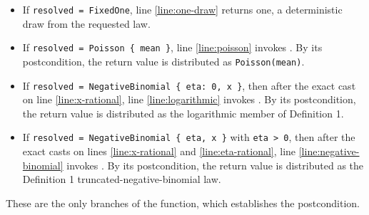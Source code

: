 \documentclass{article}
\begin{document}
\begin{itemize}
    \item If \texttt{resolved = FixedOne}, line \ref{line:one-draw} returns one,
    a deterministic draw from the requested law.
    \item If \texttt{resolved = Poisson \{ mean \}}, line \ref{line:poisson} invokes
    . By its postcondition, the return value
    is distributed as \texttt{Poisson(mean)}.
    \item If \texttt{resolved = NegativeBinomial \{ eta: 0, x \}}, then after the exact cast on
    line \ref{line:x-rational}, line \ref{line:logarithmic} invokes
    . By its postcondition, the
    return value is distributed as the logarithmic member of Definition 1.
    \item If \texttt{resolved = NegativeBinomial \{ eta, x \}} with \texttt{eta > 0}, then after
    the exact casts on lines \ref{line:x-rational} and \ref{line:eta-rational}, line
    \ref{line:negative-binomial} invokes
    .
    By its postcondition, the return value is distributed as the Definition 1
    truncated-negative-binomial law.
\end{itemize}

These are the only branches of the function, which establishes the postcondition.
\end{document}
